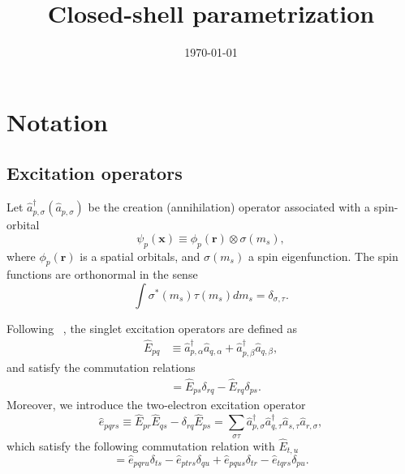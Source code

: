 \documentclass{article}
\title{Closed-shell parametrization}
\date{\today}
\begin{document}
\maketitle

\section{Notation}

\subsection{Excitation operators}
Let $\hat{a}^\dagger_{p,\sigma} (\hat{a}_{p,\sigma})$ be the creation (annihilation) operator associated with a spin-orbital
\begin{equation}
    \psi_p(\mathbf{x}) \equiv \phi_p(\mathbf{r}) \otimes \sigma(m_s),
\end{equation}
where $\phi_p(\mathbf{r})$ is a spatial orbitals, and $\sigma(m_s)$ a spin eigenfunction. The spin functions are orthonormal in the sense 
\begin{equation}
    \int \sigma^*(m_s) \tau(m_s) dm_s = \delta_{\sigma, \tau}.
\end{equation}

Following \citeauthor{helgaker2013molecular}~\cite{helgaker2013molecular}, the singlet excitation operators are defined as
\begin{align}
    \hat{E}_{pq} &\equiv \hat{a}_{p,\alpha}^\dagger \hat{a}_{q,\alpha} + \hat{a}_{p, \beta}^\dagger \hat{a}_{q, \beta},
\end{align}
and satisfy the commutation relations
\begin{align}
    [\hat{E}_{pq}, \hat{E}_{rs}] &= \hat{E}_{ps} \delta_{rq} - \hat{E}_{rq} \delta_{ps} \label{comm_Epq_Ers}.
\end{align}
Moreover, we introduce the two-electron excitation operator
\begin{equation}
    \hat{e}_{pqrs} \equiv \hat{E}_{pr} \hat{E}_{qs} - \delta_{rq} \hat{E}_{ps} = \sum_{\sigma \tau} \hat{a}_{p,\sigma}^\dagger \hat{a}_{q, \tau}^\dagger \hat{a}_{s, \tau} \hat{a}_{r, \sigma}, 
\end{equation}
which satisfy the following commutation relation with $\hat{E}_{t,u}$
\begin{equation}
    [\hat{e}_{pqrs}, \hat{E}_{tu}] = \hat{e}_{pqru} \delta_{ts} - \hat{e}_{ptrs}\delta_{qu} + \hat{e}_{pqus}\delta_{tr} - \hat{e}_{tqrs} \delta_{pu} \label{comm_epqrs_Etu}.
\end{equation}
\end{document}
